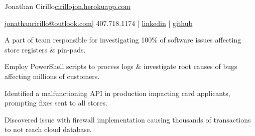 \documentclass[]{deedy-resume-openfont}
\begin{document}
%
%


\namesection \LARGE {{Jonathan} {Cirillo}}{\href{https://cirillojon.herokuapp.com/}{cirillojon.herokuapp.com}}

\vspace{18pt}

\newcommand{\linkedin}[1]{\faLinkedin\hspace{0.5em}\href{https://linkedin.com/in/#1}{\texttt{#1}}}
\newcommand{\github}[1]{\faGithub\hspace{0.5em}\href{https://github.com/#1}{\texttt{#1}}}

{\FA \faEnvelope} {\href{mailto:jonathancirillo@outlook.com}{jonathancirillo@outlook.com}}\hspace{5pt}|\hspace{5pt}{\FA \faPhone} 407.718.1174 |\hspace{5pt} {\FA \faLinkedin} {\href{https://linkedin.com/in/jonathan-cirillo/}{linkedin}} \hspace{5pt}|\hspace{5pt} {\FA \faGithub} {\href{https://github.com/cirillojon}{github}}


\vspace{6pt}



\begin{tightemize}
\item A part of team responsible for investigating 100\% of software issues affecting store registers \& pin-pads.
\item Employ PowerShell scripts to process logs \& investigate root causes of bugs affecting millions of customers.
\item Identified a malfunctioning API in production impacting card applicants, prompting fixes
sent to all stores.
\item Discovered issue with firewall implementation causing thousands of transactions to not reach cloud database.
\end{tightemize}
\sectionsep
\end{document}
